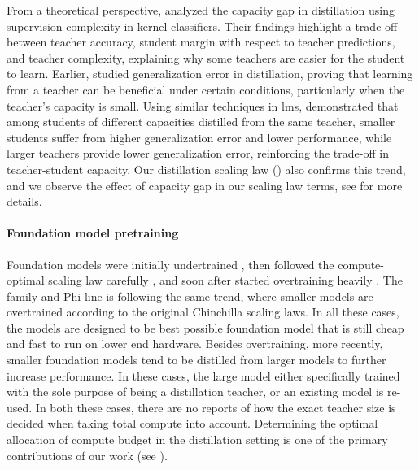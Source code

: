 From a theoretical perspective, \citet{DBLP:conf/iclr/HarutyunyanRMKK23} analyzed the capacity gap in distillation using supervision complexity in kernel classifiers. Their findings highlight a trade-off between teacher accuracy, student margin with respect to teacher predictions, and teacher complexity, explaining why some teachers are easier for the student to learn. 
Earlier, \citet{DBLP:journals/corr/Lopez-PazBSV15} studied generalization error in distillation, proving that learning from a teacher can be beneficial under certain conditions, particularly when the teacher's capacity is small. Using similar techniques in \gls{lm}s, \citet{DBLP:conf/acl/ZhangYLWXWS23} demonstrated that among students of different capacities distilled from the same teacher, smaller students suffer from higher generalization error and lower performance, while larger teachers provide lower generalization error, reinforcing the trade-off in teacher-student capacity. Our distillation scaling law () also confirms this trend, and we observe the effect of capacity gap in our scaling law terms, see  for more details.

\paragraph{Foundation model pretraining}
Foundation models were initially undertrained \citep{DBLP:conf/nips/BrownMRSKDNSSAA20}, then followed the compute-optimal scaling law carefully \citep{DBLP:journals/corr/abs-2203-15556,DBLP:journals/corr/abs-2406-12907,DBLP:journals/corr/abs-2404-10102}, and soon after started overtraining heavily \citep{DBLP:conf/icml/SardanaPDF24,DBLP:journals/corr/abs-2401-02954,DBLP:journals/corr/abs-2404-06395,DBLP:journals/corr/abs-2403-08295,DBLP:journals/corr/abs-2310-06825}. The \llama family \citep{DBLP:journals/corr/abs-2302-13971,DBLP:journals/corr/abs-2307-09288,DBLP:journals/corr/abs-2407-21783} and Phi line \citep{DBLP:journals/corr/abs-2309-05463,DBLP:journals/corr/abs-2404-14219,DBLP:journals/corr/abs-2412-08905} is following the same trend, where smaller models are overtrained according to the original Chinchilla scaling laws. In all these cases, the models are designed to be best possible foundation model that is still cheap and fast to run on lower end hardware.
Besides overtraining, more recently, smaller foundation models tend to be distilled from larger models \citep{DBLP:journals/corr/abs-2407-21075,DBLP:journals/corr/abs-2408-00118,DBLP:journals/corr/abs-2403-05530} to further increase performance.
In these cases, the large model either specifically trained with the sole purpose of being a distillation teacher, or an existing model is re-used. In both these cases, there are no reports of how the exact teacher size is decided when taking total compute into account.
Determining the optimal allocation of compute budget in the distillation setting is one of the primary contributions of our work (see ).

